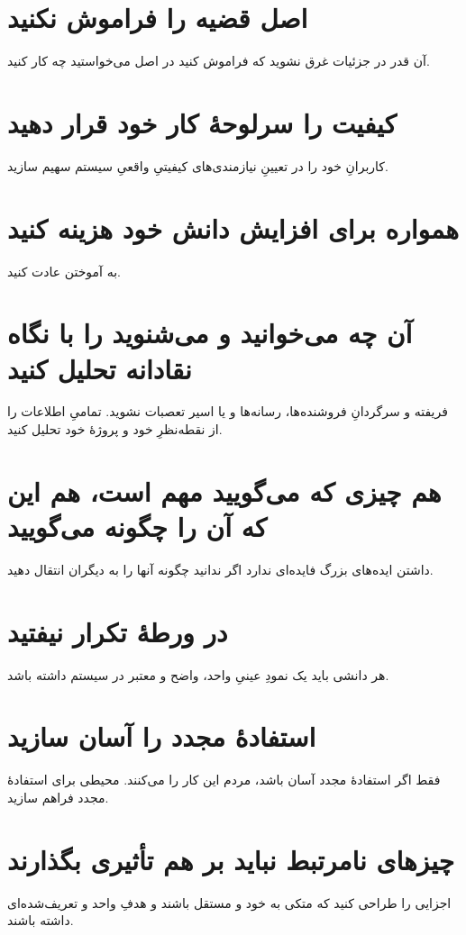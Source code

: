 \documentclass[10pt, a4paper]{book}
\begin{document}
    \section{اصل قضیه را فراموش نکنید}
    آن قدر در جزئیات غرق نشوید که فراموش کنید در اصل می‌خواستید چه کار کنید.
    
    \section{کیفیت را سرلوحهٔ کار خود قرار دهید}
    کاربرانِ خود را در تعیینِ نیازمندی‌های کیفیتیِ واقعیِ سیستم سهیم سازید.

    \section{همواره برای افزایش دانش خود هزینه کنید}
    به آموختن عادت کنید.

    \section{آن چه می‌خوانید و می‌شنوید را با نگاه نقادانه تحلیل کنید}
    فریفته و سرگردانِ فروشنده‌ها، رسانه‌ها و یا اسیر تعصبات نشوید. تمامیِ اطلاعات را از نقطه‌نظرِ خود و پروژهٔ خود تحلیل کنید.

    \section{هم چیزی که می‌گویید مهم است، هم این که آن را چگونه می‌گویید}
    داشتن ایده‌های بزرگ فایده‌ای ندارد اگر ندانید چگونه آنها را به دیگران انتقال دهید.

    \section{در ورطهٔ تکرار نیفتید}
    هر دانشی باید یک نمودِ عینیِ واحد، واضح و معتبر در سیستم داشته باشد.

    \section{استفادهٔ مجدد را آسان سازید}
    فقط اگر استفادهٔ مجدد آسان باشد، مردم این کار را می‌کنند. محیطی برای استفادهٔ مجدد فراهم سازید.
    
    \section{چیزهای نامرتبط نباید بر هم تأثیری بگذارند}
    اجزایی را طراحی کنید که متکی به خود و مستقل باشند و هدفِ واحد و تعریف‌شده‌ای داشته باشند.
\end{document}
